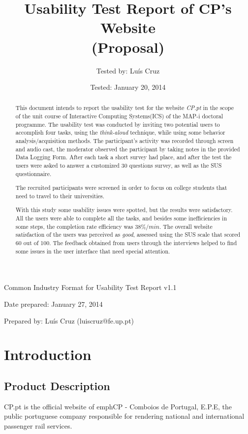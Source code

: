 \documentclass[a4paper]{article}
\title{Usability Test Report of CP's Website\\ (Proposal)}
\author[1]{Tested by: Luís  Cruz}
\affil[1]{MAP-i\\ Joint Doctoral Programme in Computer Science}
\date{Tested: January 20, 2014}
\begin{document}
\maketitle

Common Industry Format for Usability Test Report v1.1

Date prepared: January 27, 2014

Prepared by: Luís Cruz (luiscruz@fe.up.pt)

\begin{abstract}
	
	This document intends to report the usability test for the website \emph{CP.pt} in the scope of the unit course of Interactive Computing Systems(ICS) of the MAP-i doctoral programme. The usability test was conducted by inviting two potential users to accomplish four tasks, using the \emph{think-aloud} technique, while using some behavior analysis/acquisition methods. The participant's activity was recorded through screen and audio cast, the moderator observed the participant by taking notes in the provided Data Logging Form. After each task a short survey had place, and after the test the users were asked to answer a customized 30 questions survey, as well as the SUS questionnaire.

The recruited participants were screened in order to focus on college students that need to travel to their universities. 

With this study some usability issues were spotted, but the results were satisfactory. All the users were able to complete all the tasks, and besides some inefficiencies in some steps, the completion rate efficiency was $38\%/min$.
The overall website satisfaction of the users was perceived as \emph{good}, assessed using the SUS scale that scored 60 out of 100. The feedback obtained from users through the interviews helped to find some issues in the user interface that need special attention.
\end{abstract}

\section{Introduction}
\subsection{Product Description}

CP.pt is the official website of emph{CP - Comboios de Portugal, E.P.E}, the public portuguese company responsible for rendering national and international passenger rail services.
\end{document}
